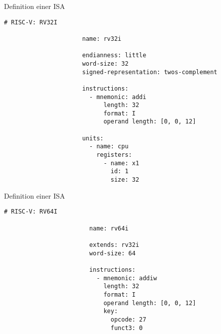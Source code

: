 \begin{frame}[fragile]{Definition einer ISA}
  \begin{lstlisting}[style=isa]
                      # RISC-V: RV32I

                      name: rv32i

                      endianness: little
                      word-size: 32
                      signed-representation: twos-complement

                      instructions:
                        - mnemonic: addi
                            length: 32
                            format: I
                            operand length: [0, 0, 12]

                      units:
                        - name: cpu
                          registers:
                            - name: x1
                              id: 1
                              size: 32
  \end{lstlisting}
\end{frame}

\begin{frame}[fragile]{Definition einer ISA}
  \vspace{-0.5cm}
  \begin{lstlisting}[style=isa]
                        # RISC-V: RV64I

                        name: rv64i

                        extends: rv32i
                        word-size: 64

                        instructions:
                          - mnemonic: addiw
                            length: 32
                            format: I
                            operand length: [0, 0, 12]
                            key:
                              opcode: 27
                              funct3: 0
  \end{lstlisting}
\end{frame}
